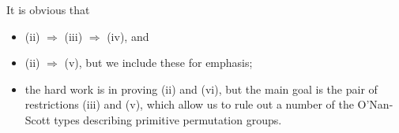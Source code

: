 \begin{frame}[label=Example7elementPreziImplications]{}
It is obvious that 
    \begin{itemize}
    \item (ii) $\Rightarrow$ (iii) $\Rightarrow$ (iv), and  
    \item (ii) $\Rightarrow$ (v), but we include these for
      emphasis;
    \item the hard work is in proving (ii) and (vi), but
      the main goal is the pair of restrictions (iii) and (v), which allow us to rule
      out a number of the O'Nan-Scott types describing primitive permutation
      groups. 
  \end{itemize}
\end{frame}




%







